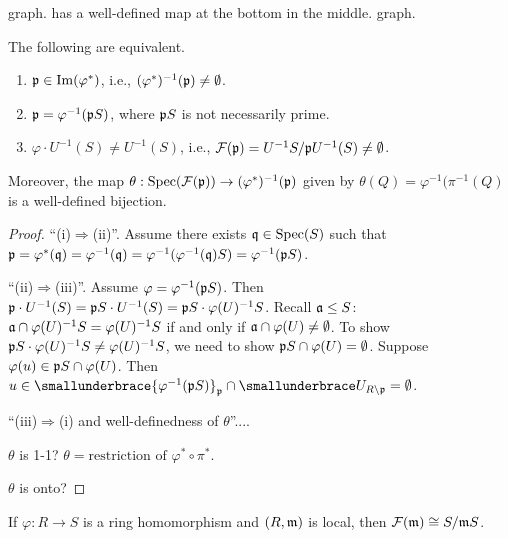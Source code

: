 \begin{construction}
    graph. has a well-defined map at the bottom in the middle.
    graph.
\end{construction}

\begin{theorem}
    The following are equivalent.
    \begin{enumerate}
        \item $\mathfrak{p} \in \operatorname{Im}(\varphi^*)$, i.e., $(\varphi^*)^{-1}(\mathfrak{p}) \neq \emptyset$.
        \item $\mathfrak{p} = \varphi^{-1}(\mathfrak{p} S)$, where $\mathfrak{p} S$ is not necessarily prime.
        \item $\varphi \cdot U^{-1}(S) \neq U^{-1}(S)$, i.e., $\mathcal{F}(\mathfrak{p}) = U^{-1}S/\mathfrak{p} U^{-1}(S) \neq \emptyset$.
    \end{enumerate}
    Moreover, the map $\theta: \operatorname{Spec}(\mathcal{F}(\mathfrak{p})) \to (\varphi^*)^{-1}(\mathfrak{p})$ given by $\theta(Q) = \varphi^{-1}(\pi^{-1}(Q)$ is a well-defined bijection.
\end{theorem}

\begin{proof}
    ``(i)$\Rightarrow$(ii)''. Assume there exists $\mathfrak{q} \in \operatorname{Spec}(S)$ such that $\mathfrak{p} = \varphi^*(\mathfrak{q}) = \varphi^{-1}(\mathfrak{q}) = \varphi^{-1}(\varphi^{-1}(\mathfrak{q})S) = \varphi^{-1}(\mathfrak{p} S)$. \par 
    ``(ii)$\Rightarrow$(iii)''. Assume $\varphi = \varphi^{-1}(\mathfrak{p} S)$. Then $\mathfrak{p} \cdot U^{-1}(S) = \mathfrak{p} S \cdot U^{-1}(S) = \mathfrak{p} S \cdot \varphi(U)^{-1}S$. Recall $\mathfrak{a} \leq S$: $\mathfrak{a} \cap \varphi(U)^{-1}S = \varphi(U)^{-1}S$ if and only if $\mathfrak{a} \cap \varphi(U) \neq \emptyset$. To show $\mathfrak{p} S \cdot \varphi(U)^{-1}S \neq \varphi(U)^{-1}S$, we need to show $\mathfrak{p} S \cap \varphi(U) = \emptyset$. Suppose $\varphi(u) \in \mathfrak{p} S \cap \varphi(U)$. Then $u \in \smallunderbrace{\varphi^{-1}(\ffp S)}_{\ffp} \cap \smallunderbrace U_{R \setminus \ffp} = \emptyset$. \par 
    ``(iii)$\Rightarrow$(i) and well-definedness of $\theta$''.... \par 
    $\theta$ is 1-1? $\theta = \text{restriction of $\varphi^* \circ \pi^{*}$}$. \par 
    $\theta$ is onto?
\end{proof}

\begin{proposition}
    If $\varphi:R \to S$ is a ring homomorphism and $(R,\mathfrak{m})$ is local, then $\mathcal{F}(\mathfrak{m}) \cong S/\mathfrak{m} S$.
\end{proposition}

